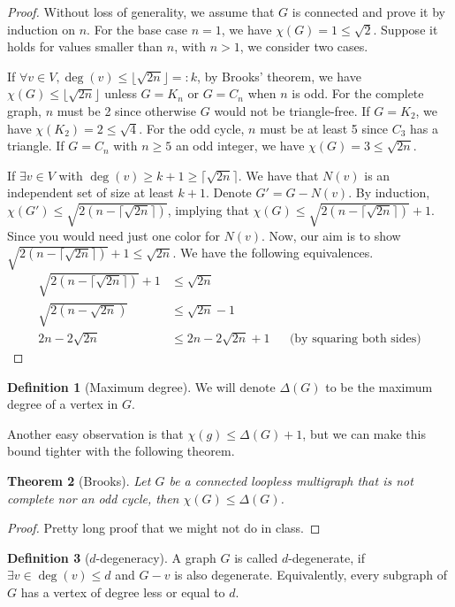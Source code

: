 \documentclass{tufte-handout}
\newtheorem{thm}{Theorem}
\theoremstyle{definition}
\newtheorem{defn}[thm]{Definition}
\theoremstyle{remark}
\begin{document}
\begin{proof}
	Without loss of generality, we assume that $G$ is connected and prove it by induction on $n$. For the base case $n=1$, we have $\chi(G) = 1 \leq \sqrt{2}$. Suppose it holds for values smaller than $n$, with $n > 1$, we consider two cases.
	
	If $\forall v \in V, \deg(v) \leq \lfloor \sqrt{2n} \rfloor =: k$, by Brooks' theorem, we have $\chi(G) \leq \lfloor \sqrt{2n} \rfloor$ unless $G = K_n$ or $G = C_n$ when $n$ is odd. For the complete graph, $n$ must be 2 since otherwise $G$ would not be triangle-free. If $G = K_2$, we have $\chi(K_2) =2 \leq \sqrt{4}$. For the odd cycle, $n$ must be at least 5 since $C_3$ has a triangle. If $G = C_n$ with $n \geq 5$ an odd integer, we have $\chi(G) = 3 \leq \sqrt{2n}$.
	
	If $\exists v \in V$ with $\deg(v) \geq k+1 \geq \lceil \sqrt{2n} \rceil$. We have that $N(v)$ is an independent set of size at least $k+1$. Denote $G' = G-N(v)$. By induction, $\chi(G') \leq \sqrt{2(n-\lceil \sqrt{2n} \rceil)}$, implying that $\chi(G) \leq \sqrt{2(n-\lceil \sqrt{2n} \rceil)} +1$. Since you would need just one color for $N(v)$. Now, our aim is to show $\sqrt{2(n-\lceil \sqrt{2n} \rceil)} +1 \leq \sqrt{2n}$. We have the following equivalences.
	\begin{align*}
	\sqrt{2(n-\lceil \sqrt{2n} \rceil)} +1 &\leq \sqrt{2n}\\
	\sqrt{2(n-\sqrt{2n})} &\leq \sqrt{2n}-1\\
	2n-2\sqrt{2n} &\leq 2n-2\sqrt{2n} +1 &&\mbox{(by squaring both sides)}
	\end{align*}
\end{proof}
\begin{defn}[Maximum degree]
	We will denote $\Delta(G)$ to be the maximum degree of a vertex in $G$.
\end{defn}
Another easy observation is that $\chi(g) \leq \Delta(G) + 1$, but we can make this bound tighter with the following theorem.
\begin{thm}[Brooks]
	Let $G$ be a connected loopless multigraph that is not complete nor an odd cycle, then $\chi(G) \leq \Delta(G)$.
\end{thm}
\begin{proof}
	Pretty long proof that we might not do in class.
\end{proof}
\begin{defn}[$d$-degeneracy]
	A graph $G$ is called $d$-degenerate, if $\exists v \in \deg(v) \leq d$ and $G-v$ is also degenerate. Equivalently, every subgraph of $G$ has a vertex of degree less or equal to $d$.
\end{defn}
\end{document}
